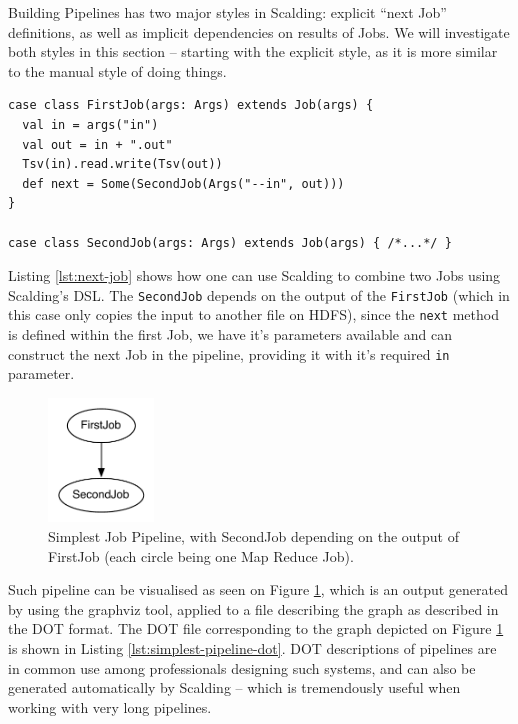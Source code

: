 Building Pipelines has two major styles in Scalding: explicit ``next Job'' definitions, as well as implicit dependencies on results of Jobs. We will investigate both styles in this section -- starting with the explicit style, as it is more similar to the manual style of doing things.

\begin{lstlisting}[caption={Explicit ``next job'' definition within a Scalding Job class}, label={lst:next-job}]
case class FirstJob(args: Args) extends Job(args) {
  val in = args("in")
  val out = in + ".out"
  Tsv(in).read.write(Tsv(out))
  def next = Some(SecondJob(Args("--in", out)))
}

case class SecondJob(args: Args) extends Job(args) { /*...*/ }
\end{lstlisting}

Listing \ref{lst:next-job} shows how one can use Scalding to combine two Jobs using Scalding's DSL. The \verb|SecondJob| depends on the output of the \verb|FirstJob| (which in this case only copies the input to another file on HDFS), since the \verb|next| method is defined within the first Job, we have it's parameters available and can construct the next Job in the pipeline, providing it with it's required \verb|in| parameter. 

\begin{figure}[ch!]
  \centering
  \includegraphics[width=0.25\textwidth]{img/simplest-pipeline}
  \caption{Simplest Job Pipeline, with SecondJob depending on the output of FirstJob (each circle being one Map Reduce Job).}
  \label{fig:simplest-pipeline}
\end{figure}

Such pipeline can be visualised as seen on Figure \ref{fig:simplest-pipeline}, which is an output generated by using the graphviz tool, applied to a file describing the graph as described in the DOT format. The DOT file corresponding to the graph depicted on Figure \ref{fig:simplest-pipeline} is shown in Listing \ref{lst:simplest-pipeline-dot}. DOT descriptions of pipelines are in common use among professionals designing such systems, and can also be generated automatically by Scalding -- which is tremendously useful when working with very long pipelines.

